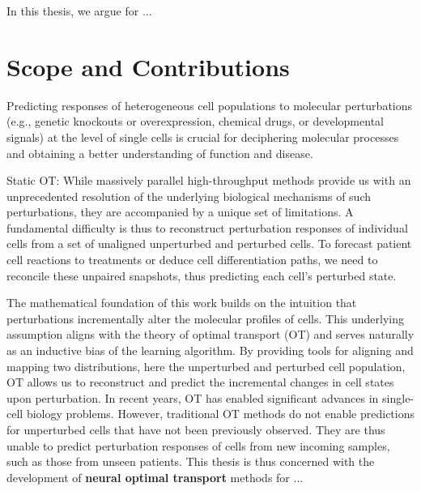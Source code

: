 In this thesis, we argue for ...

\section{Scope and Contributions}

Predicting responses of heterogeneous cell populations to molecular perturbations (e.g., genetic knockouts or overexpression, chemical drugs, or developmental signals) at the level of single cells is crucial for deciphering molecular processes and obtaining a better understanding of function and disease.

Static OT:
While massively parallel high-throughput methods provide us with an unprecedented resolution of the underlying biological mechanisms of such perturbations, they are accompanied by a unique set of limitations.
A fundamental difficulty is thus to reconstruct perturbation responses of individual cells from a set of unaligned unperturbed and perturbed cells. To forecast patient cell reactions to treatments or deduce cell differentiation paths, we need to reconcile these unpaired snapshots, thus predicting each cell's perturbed state.




The mathematical foundation of this work builds on the intuition that perturbations incrementally alter the molecular profiles of cells. This underlying assumption aligns with the theory of optimal transport (OT) and serves naturally as an inductive bias of the learning algorithm. By providing tools for aligning and mapping two distributions, here the unperturbed and perturbed cell population, OT allows us to reconstruct and predict the incremental changes in cell states upon perturbation. 
In recent years, OT has enabled significant advances in single-cell biology problems. However, traditional OT methods do not enable predictions for unperturbed cells that have not been previously observed.
They are thus unable to predict perturbation responses of cells from new incoming samples, such as those from unseen patients. 
This thesis is thus concerned with the development of \textbf{neural optimal transport} methods for ...

